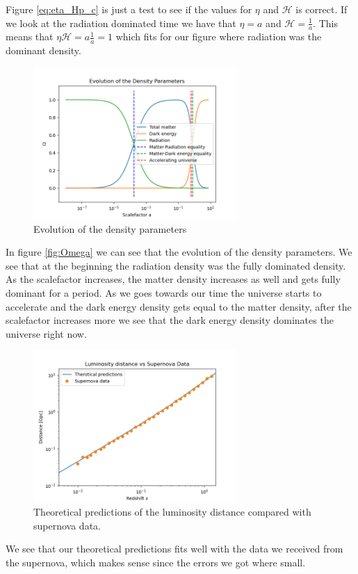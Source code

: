 \documentclass{aa}
\begin{document}
Figure \eqref{eq:eta_Hp_c} is just a test to see if the values for $\eta$ and $\mathcal{H}$ is correct. If we look at the radiation dominated time we have that $\eta=a$ and $\mathcal{H}=\frac{1}{a}$. This means that $\eta\mathcal{H}=a\frac{1}{a}=1$ which fits for our figure where radiation was the dominant density. 
\begin{figure}[H]
	\centering
	\includegraphics[width=77mm]{Omega.png}
	\caption{Evolution of the density parameters}
	\label{fig:Omega}
\end{figure}
In figure \eqref{fig:Omega} we can see that the evolution of the density parameters. We see that at the beginning the radiation density was the fully dominated density. As the scalefactor increases, the matter density increases as well and gets fully dominant for a period. As we goes towards our time the universe starts to accelerate and the dark energy density gets equal to the matter density, after the scalefactor increases more we see that the dark energy density dominates the universe right now. \\
\begin{figure}[H]
	\centering
	\includegraphics[width=77mm]{LD_vs_SN.png}
	\caption{Theoretical predictions of the luminosity distance compared with supernova data.}
	\label{fig:LD_vs_SN}
\end{figure}
We see that our theoretical predictions fits well with the data we received from the supernova, which makes sense since the errors we got where small.
\clearpage
\end{document}

